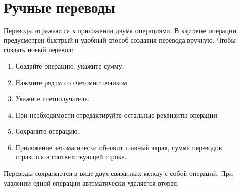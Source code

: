 \documentclass[a4paper,10pt,russian]{sphinxmanual}
\begin{document}
\noindent{}


\section{Ручные переводы}
\label{\detokenize{transactions:id5}}
\sphinxAtStartPar
Переводы отражаются в приложении двумя операциями. В карточке операции предусмотрен быстрый и удобный способ
создания перевода вручную. Чтобы создать новый перевод:
\begin{enumerate}
%
\item {} 
\sphinxAtStartPar
Создайте операцию, укажите сумму.

\item {} 
\sphinxAtStartPar
Нажмите  рядом со счетом\sphinxhyphen{}источником.

\item {} 
\sphinxAtStartPar
Укажите счет\sphinxhyphen{}получатель.

\item {} 
\sphinxAtStartPar
При необходимости отредактируйте остальные реквизиты операции.

\item {} 
\sphinxAtStartPar
Сохраните операцию.

\item {} 
\sphinxAtStartPar
Приложение автоматически обновит главный экран, сумма переводов отразится в соответствующей строке.

\end{enumerate}

\noindent{}
\noindent{}
\noindent{}
\noindent{}
\noindent{}
\noindent{}
\noindent{}

\sphinxAtStartPar
Переводы сохраняются в виде двух связанных между с собой операций. При удалении одной
операции автоматически удаляется вторая.
\end{document}
